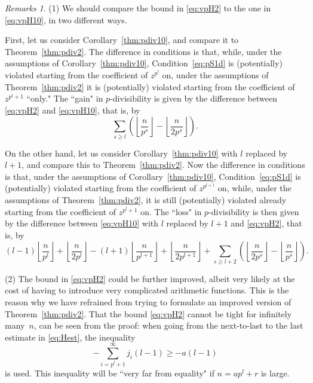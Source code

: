 \documentclass[12pt,reqno]{amsart}
\numberwithin{equation}{section}
\theoremstyle{remark}
\newtheorem*{remarks}{Remarks}
\begin{document}
\begin{remarks}
(1)
We should compare the bound in \eqref{eq:vpH2} to the one in \eqref{eq:vpH10},
in two different ways.

First, let us consider Corollary~\ref{thm:pdiv10}, and compare
it to Theorem~\ref{thm:pdiv2}. The difference in conditions
is that, while, under the assumptions of Corollary~\ref{thm:pdiv10}, 
Condition~\eqref{eq:pS1d} is (potentially) 
violated starting from the coefficient of
$z^{p^l}$ on, under the assumptions of Theorem~\ref{thm:pdiv2}
it is (potentially) violated starting from the coefficient of 
$z^{p^l+1}$ ``only."
The ``gain" in $p$-divisibility is given by the difference between
\eqref{eq:vpH2} and \eqref{eq:vpH10}, that is, by
$$
\sum_{s \ge l}\left({\left\lfloor{\frac {n} {p^{s}}}\right\rfloor}-{\left\lfloor{\frac {n} {2p^{s}}}\right\rfloor}\right).
$$

On the other hand, let us consider Corollary~\ref{thm:pdiv10} with $l$
replaced by $l+1$, and compare
this to Theorem~\ref{thm:pdiv2}. Now the difference in conditions
is that, under the assumptions of Corollary~\ref{thm:pdiv10}, 
Condition~\eqref{eq:pS1d} is (potentially) violated  
starting from the coefficient of
$z^{p^{l+1}}$ on, while, under the assumptions of Theorem~\ref{thm:pdiv2},
it is still (potentially) violated already 
starting from the coefficient of $z^{p^l+1}$ on.
The ``loss" in $p$-divisibility is then given by the difference between
\eqref{eq:vpH10} with $l$ replaced by $l+1$ and \eqref{eq:vpH2}, that is, by
$$
(l-1){\left\lfloor{\frac {n} {p^l}}\right\rfloor}+{\left\lfloor{\frac {n} {2p^{l}}}\right\rfloor}
-(l+1){\left\lfloor{\frac {n} {p^{l+1}}}\right\rfloor}+{\left\lfloor{\frac {n} {2p^{l+1}}}\right\rfloor}
+\sum_{s \ge l+2}\left({\left\lfloor{\frac {n} {2p^{s}}}\right\rfloor}
-{\left\lfloor{\frac {n} {p^{s}}}\right\rfloor} \right).
$$

\medskip
(2) The bound in \eqref{eq:vpH2} could be further improved,
albeit very likely at the cost of having to introduce very
complicated arithmetic functions. This is the reason why we have 
refrained from trying to formulate an improved version of
Theorem~\ref{thm:pdiv2}. 
That the bound \eqref{eq:vpH2}
cannot be tight for infinitely many~$n$, can be seen from the
proof: when going from the next-to-last to the last estimate
in \eqref{eq:Hest}, the inequality
$$
-\sum_{i=p^l+1}^\infty j_i(l-1)
\ge-a(l-1)
$$
is used. This inequality will be ``very far from equality" if
$n=ap^l+r$ is large.
\end{remarks}
\end{document}
